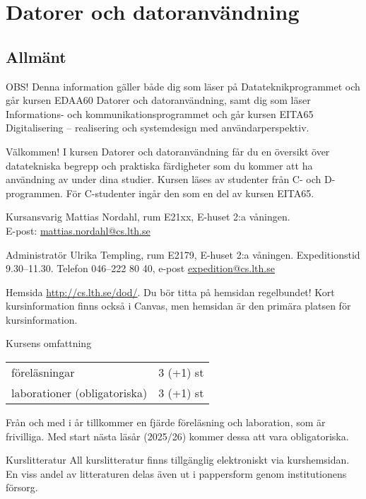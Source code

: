 \documentclass[a4paper]{memoir}
\begin{document}
\chapter*{Datorer och datoranvändning}

\section*{Allmänt}

\begin{Items}
    \item{}
    OBS! Denna information gäller både dig som läser på Datateknikprogrammet och går kursen EDAA60 Datorer och datoranvändning,
    samt dig som läser Informations- och kommunikationsprogrammet och går kursen EITA65 Digitalisering -- realisering och systemdesign med användarperspektiv.

    \item[Välkommen!]
    I kursen Datorer och datoranvändning får du en översikt över datatekniska begrepp och praktiska färdigheter som du kommer att ha användning av under dina studier. Kursen läses av studenter från C- och D-programmen. För C-studenter ingår den som en del av kursen EITA65.

    \item[Kursansvarig]
    Mattias Nordahl, rum E21xx, E-huset 2:a våningen.\\
    E-post: \url{mattias.nordahl@cs.lth.se}

    \item[Administratör]
    Ulrika Templing, rum E2179, E-huset 2:a våningen. Expeditionstid 9.30--11.30. Telefon 046--222 80 40, e-post \url{expedition@cs.lth.se}

    \item[Hemsida]
    \url{http://cs.lth.se/dod/}. Du bör titta på hemsidan regelbundet! Kort kursinformation finns också i Canvas, men hemsidan är den primära platsen för kursinformation.

    \item[Kursens omfattning]
    \begin{tabular}[t]{@{}ll}
        föreläsningar                & 3 (+1) st \\
        laborationer (obligatoriska) & 3 (+1) st \\
    \end{tabular}
    Från och med i år tillkommer en fjärde föreläsning och laboration, som är frivilliga. Med start nästa läsår (2025/26) kommer dessa att vara obligatoriska.

    \item[Kurslitteratur]
    All kurslitteratur finns tillgänglig elektroniskt via kurshemsidan. En viss andel av litteraturen delas även ut i pappersform genom institutionens försorg.
\end{Items}
\end{document}
